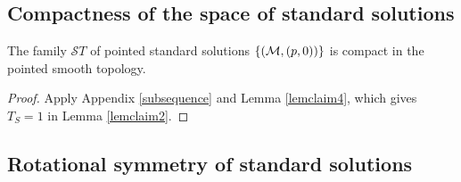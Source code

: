 \subsection{Compactness of the space of standard solutions}
\label{standardlycompact}

\begin{lemma}
  \label{lem:kl-compactness-space-standard-solutions-compactness-standard-solutions}
 \label{standardcompactness}
The family ${\mathcal ST}$ of pointed standard solutions $\{({\mathcal M},(p,0))\}$ is
compact in the pointed smooth topology.
\end{lemma}
\begin{proof}
\sketch Apply Appendix \ref{subsequence} and Lemma \ref{lemclaim4}, which gives
$T_S=1$ in Lemma \ref{lemclaim2}.
\end{proof}

\subsection{Rotational symmetry of standard solutions}
 \label{claimII.2.1}

